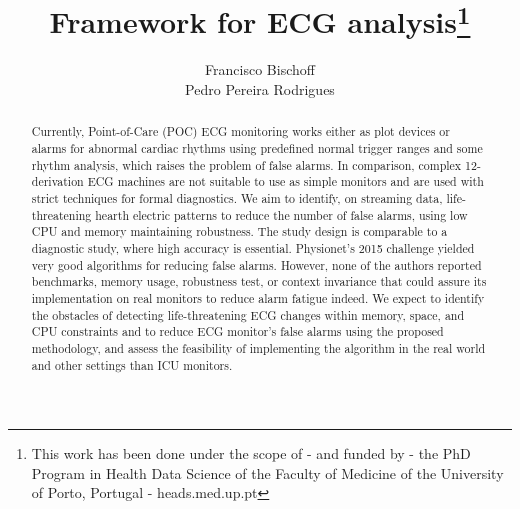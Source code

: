 \documentclass[runningheads]{llncs}
\begin{document}
%
\title{Framework for ECG analysis\thanks{This work has been done under
the scope of - and funded by - the PhD Program in Health Data Science of
the Faculty of Medicine of the University of Porto, Portugal -
heads.med.up.pt}}
%
%
%
\author{  Francisco Bischoff\\  Pedro Pereira Rodrigues }

%


\maketitle              %
%

\begin{abstract}
  Currently, Point-of-Care (POC) ECG monitoring works either as plot
  devices or alarms for abnormal cardiac rhythms using predefined normal
  trigger ranges and some rhythm analysis, which raises the problem of
  false alarms. In comparison, complex 12-derivation ECG machines are
  not suitable to use as simple monitors and are used with strict
  techniques for formal diagnostics. We aim to identify, on streaming
  data, life-threatening hearth electric patterns to reduce the number
  of false alarms, using low CPU and memory maintaining robustness. The
  study design is comparable to a diagnostic study, where high accuracy
  is essential. Physionet's 2015 challenge yielded very good algorithms
  for reducing false alarms. However, none of the authors reported
  benchmarks, memory usage, robustness test, or context invariance that
  could assure its implementation on real monitors to reduce alarm
  fatigue indeed. We expect to identify the obstacles of detecting
  life-threatening ECG changes within memory, space, and CPU constraints
  and to reduce ECG monitor's false alarms using the proposed
  methodology, and assess the feasibility of implementing the algorithm
  in the real world and other settings than ICU monitors.


\end{abstract}
%
%
\end{document}
